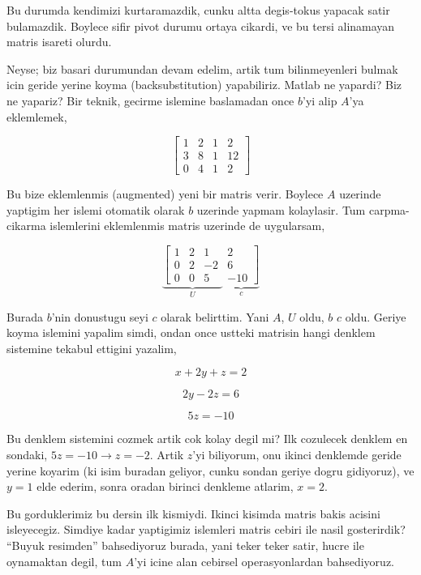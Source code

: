 \documentclass[12pt,fleqn]{article}\usepackage{../common}
\begin{document}
Bu durumda kendimizi kurtaramazdik, cunku altta degis-tokus yapacak satir
bulamazdik. Boylece sifir pivot durumu ortaya cikardi, ve bu tersi
alinamayan matris isareti olurdu.

Neyse; biz basari durumundan devam edelim, artik tum bilinmeyenleri bulmak
icin geride yerine koyma (backsubstitution) yapabiliriz. Matlab ne yapardi?
Biz ne yapariz? Bir teknik, gecirme islemine baslamadan once $b$'yi alip
$A$'ya eklemlemek,

$$ 
\left[\begin{array}{rrrr}
1 & 2 & 1 & 2\\
3 & 8 & 1 & 12 \\
0 & 4 & 1 & 2
\end{array}\right]
 $$

Bu bize eklemlenmis (augmented) yeni bir matris verir. Boylece $A$
uzerinde yaptigim her islemi otomatik olarak $b$ uzerinde yapmam
kolaylasir. Tum carpma-cikarma islemlerini eklemlenmis matris uzerinde de
uygularsam,

$$ 
\underbrace{
\left[\begin{array}{rrr}
1 & 2 & 1 \\
0 & 2 & -2 \\
0 & 0 & 5  
\end{array}\right.}_{U}
\underbrace{
\left. \begin{array}{r}
 2\\
 6\\
 -10 
\end{array}\right]}_{c}
 $$

Burada $b$'nin donustugu seyi $c$ olarak belirttim. Yani $A$, $U$ oldu,
$b$ $c$ oldu. Geriye koyma islemini yapalim simdi, ondan once ustteki
matrisin hangi denklem sistemine tekabul ettigini yazalim,

$$ x + 2y + z = 2 $$

$$ 2y -2z = 6 $$

$$ 5z = -10 $$

Bu denklem sistemini cozmek artik cok kolay degil mi? Ilk cozulecek denklem
en sondaki, $5z = -10 \rightarrow z = -2$. Artik $z$'yi biliyorum, onu
ikinci denklemde geride yerine koyarim (ki isim buradan geliyor, cunku
sondan geriye dogru gidiyoruz), ve $y = 1$ elde ederim, sonra oradan
birinci denkleme atlarim, $x = 2$. 

Bu gorduklerimiz bu dersin ilk kismiydi. Ikinci kisimda  matris bakis
acisini isleyecegiz. Simdiye kadar yaptigimiz islemleri matris cebiri ile
nasil gosterirdik? ``Buyuk resimden'' bahsediyoruz burada, yani teker teker
satir, hucre ile oynamaktan degil, tum $A$'yi icine alan cebirsel
operasyonlardan bahsediyoruz. 
\end{document}
